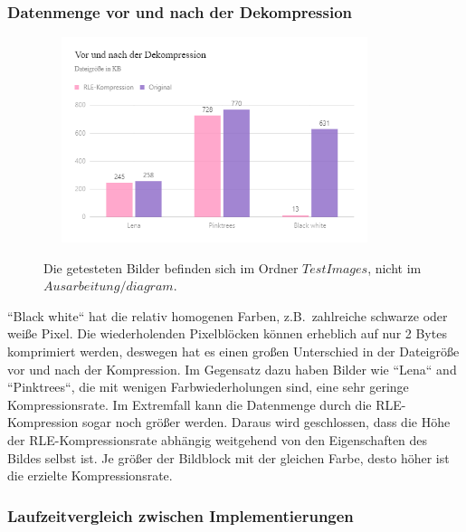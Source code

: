 \documentclass[course=erap]{aspdoc}
\begin{document}
    \subsubsection{Datenmenge vor und nach der Dekompression}\label{subsubsec:datenmenge-vor-und-nach-der-dekompression}

    \begin{figure}[htbp]
        \begin{minipage}[t]{\textwidth}
            \centering
            \includegraphics[height=6cm, width=10cm]{diagram/filesize}
        \end{minipage}\label{fig:figure4}
        Die getesteten Bilder befinden sich im Ordner $TestImages$, nicht im $Ausarbeitung/diagram$.
        \noindent
    \end{figure}
    \noindent ``Black white`` hat die relativ homogenen Farben, z.B.\ zahlreiche schwarze oder weiße Pixel.
    Die wiederholenden Pixelblöcken können erheblich auf nur 2 Bytes komprimiert werden, deswegen hat es einen großen
    Unterschied in der Dateigröße vor und nach der Kompression.
    \newline
    \newline
    Im Gegensatz dazu haben Bilder wie ``Lena`` and ``Pinktrees``, die mit wenigen Farbwiederholungen sind, eine sehr
    geringe Kompressionsrate.
    Im Extremfall kann die Datenmenge durch die RLE-Kompression sogar noch größer werden.
    \newline
    \newline
    Daraus wird geschlossen, dass die Höhe der RLE-Kompressionsrate abhängig weitgehend von den
    Eigenschaften des Bildes selbst ist.
    Je größer der Bildblock mit der gleichen Farbe, desto höher ist die erzielte Kompressionsrate.

    \subsubsection{Laufzeitvergleich zwischen Implementierungen}\label{subsubsec:laufzeitvergleich-zwischen-implementierungen}
\end{document}
